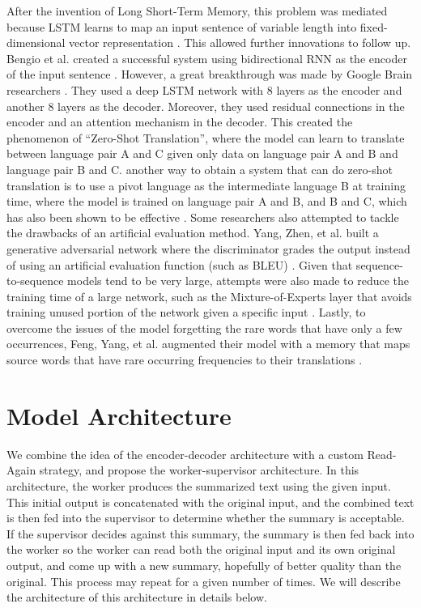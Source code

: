 \documentclass[letterpaper]{article} %
\begin{document}
After the invention of Long Short-Term Memory, this problem was mediated because LSTM learns to map an input sentence of variable length into fixed-dimensional vector representation \cite{sutskever2014sequence}. This allowed further innovations to follow up. Bengio et al. created a successful system using bidirectional RNN as the encoder of the input sentence \cite{bahdanau2014neural}. However, a great breakthrough was made by Google Brain researchers \cite{johnson2016google}. They used a deep LSTM network with 8 layers as the encoder and another 8 layers as the decoder. Moreover, they used residual connections in the encoder and an attention mechanism in the decoder. This created the phenomenon of “Zero-Shot Translation”, where the model can learn to translate between language pair A and C given only data on language pair A and B and language pair B and C. another way to obtain a system that can do zero-shot translation is to use a pivot language as the intermediate language B at training time, where the model is trained on language pair A and B, and B and C, which has also been shown to be effective \cite{chen2017teacher}. Some researchers also attempted to tackle the drawbacks of an artificial evaluation method. Yang, Zhen, et al. built a generative adversarial network where the discriminator grades the output instead of using an artificial evaluation function (such as BLEU) \cite{yang2017improving}. Given that sequence-to-sequence models tend to be very large, attempts were also made to reduce the training time of a large network, such as the Mixture-of-Experts layer that avoids training unused portion of the network given a specific input \cite{shazeer2017outrageously}. Lastly, to overcome the issues of the model forgetting the rare words that have only a few occurrences, Feng, Yang, et al. augmented their model with a memory that maps source words that have rare occurring frequencies to their translations \cite{feng2017memory}.

\section{Model Architecture}
We combine the idea of the encoder-decoder architecture with a custom Read-Again strategy, and propose the worker-supervisor architecture. In this architecture, the worker produces the summarized text using the given input. This initial output is concatenated with the original input, and the combined text is then fed into the supervisor to determine whether the summary is acceptable. If the supervisor decides against this summary, the summary is then fed back into the worker so the worker can read both the original input and its own original output, and come up with a new summary, hopefully of better quality than the original. This process may repeat for a given number of times. We will describe the architecture of this architecture in details below.
\end{document}
